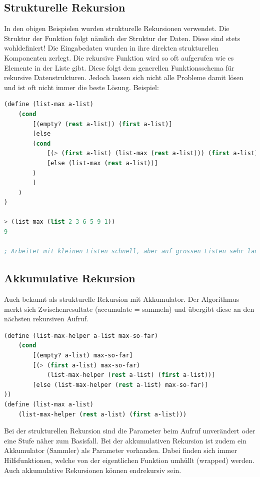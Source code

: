 \subsection{Strukturelle Rekursion}
In den obigen Beispielen wurden strukturelle Rekursionen verwendet. Die Struktur der Funktion folgt nämlich der Struktur der Daten. Diese sind stets wohldefiniert! Die Eingabedaten wurden in ihre direkten strukturellen Komponenten zerlegt. Die rekursive Funktion wird so oft aufgerufen wie es Elemente in der Liste gibt. Diese folgt dem generellen Funktionsschema für rekursive Datenstrukturen. Jedoch lassen sich nicht alle Probleme damit lösen und ist oft nicht immer die beste Lösung. Beispiel:

\begin{lstlisting}[language=Lisp, caption=Strukturelle Rekursion - Beispiel Maximumssuche]
(define (list-max a-list)
	(cond
		[(empty? (rest a-list)) (first a-list)]
		[else 
		(cond
			[(> (first a-list) (list-max (rest a-list))) (first a-list)]
			[else (list-max (rest a-list))]
		)
		]
	)
)

> (list-max (list 2 3 6 5 9 1))
9

; Arbeitet mit kleinen Listen schnell, aber auf grossen Listen sehr langsam. Das Problem ist, dass die Lösung zwei Rekursionen hat - die Rekursionsaufrufe verdoppeln sich!
\end{lstlisting}

\subsection{Akkumulative Rekursion}
Auch bekannt als strukturelle Rekursion mit Akkumulator. Der Algorithmus merkt sich Zwischenresultate (accumulate = sammeln) und übergibt diese an den nächsten rekursiven Aufruf.

\begin{lstlisting}[language=Lisp, caption=Akkumulative Rekursion - Beispiel Maximumssuche]
(define (list-max-helper a-list max-so-far)
	(cond
		[(empty? a-list) max-so-far]
		[(> (first a-list) max-so-far)
			(list-max-helper (rest a-list) (first a-list))]
		[else (list-max-helper (rest a-list) max-so-far)]
))
(define (list-max a-list)
	(list-max-helper (rest a-list) (first a-list)))
\end{lstlisting}

Bei der strukturellen Rekursion sind die Parameter beim Aufruf unverändert oder eine Stufe näher zum Basisfall. Bei der akkumulativen Rekursion ist zudem ein Akkumulator (Sammler) als Parameter vorhanden. Dabei finden sich immer Hilfsfunktionen, welche von der eigentlichen Funktion umhüllt (wrapped) werden. Auch akkumulative Rekursionen können endrekursiv sein.

